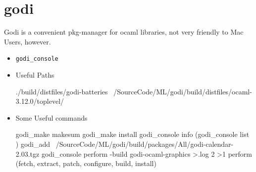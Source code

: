 
\section{godi}
\label{sec:godi}

Godi is a convenient pkg-manager for ocaml libraries, not very
friendly to Mac Users, however.
\begin{itemize}
\item \verb|godi_console |

\item Useful Paths \\
\begin{bluetext}
./build/distfiles/godi-batteries
~/SourceCode/ML/godi/build/distfiles/ocaml-3.12.0/toplevel/

\end{bluetext}


\item Some Useful commands
\begin{bluetext}
godi_make makesum
godi_make  install
godi_console info (godi_console list )
godi_add ~/SourceCode/ML/godi/build/packages/All/godi-calendar-2.03.tgz
godi_console perform -build godi-ocaml-graphics  >.log 2 >1
perform (fetch, extract, patch, configure, build, install)
\end{bluetext}
  
\end{itemize}

